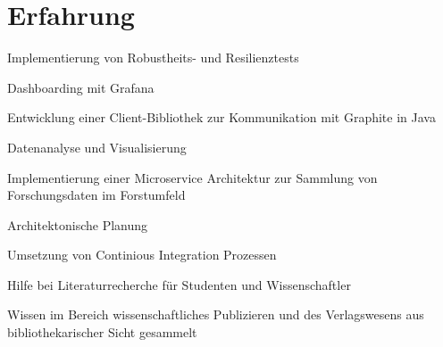 \documentclass[]{deedy-resume-openfont}
\begin{document}
\begin{minipage}[t]{0.66\textwidth}


\section{Erfahrung}

\vspace{\topsep} %
\begin{tightemize}
  \item Implementierung von Robustheits- und Resilienztests
  \item Dashboarding mit Grafana
  \item Entwicklung einer Client-Bibliothek zur Kommunikation mit Graphite in Java
  \item Datenanalyse und Visualisierung
\end{tightemize}
\sectionsep

\vspace{\topsep} %
\begin{tightemize}
  \item Implementierung einer Microservice Architektur zur Sammlung von Forschungsdaten
  im Forstumfeld
  \item Architektonische Planung
  \item Umsetzung von Continious Integration Prozessen
\end{tightemize}
\sectionsep

\vspace{\topsep} %
\begin{tightemize}
  \item Hilfe bei Literaturrecherche für Studenten und Wissenschaftler
  \item Wissen im Bereich wissenschaftliches Publizieren und des Verlagswesens aus bibliothekarischer Sicht gesammelt
\end{tightemize}
\sectionsep


\end{minipage}
\end{document}
